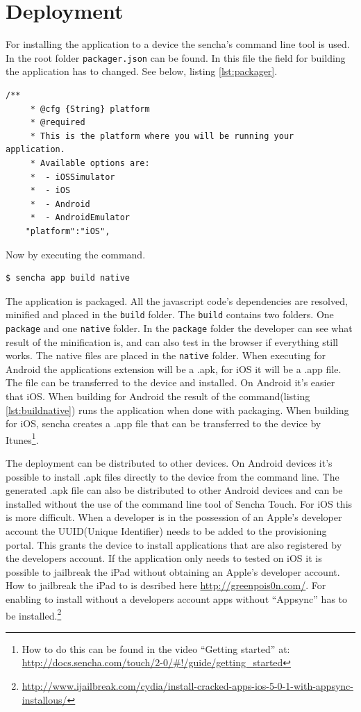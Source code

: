 \section{Deployment}
For installing the application to a device the sencha's command line tool is used. In the root folder \texttt{packager.json} can be found. In this file the field for building the application has to changed. See below, listing \ref{lst:packager}.
\begin{lstlisting}[caption={packager.json},label={lst:packager}]
	/**
	 * @cfg {String} platform
	 * @required
	 * This is the platform where you will be running your application.
	 * Available options are:
	 *  - iOSSimulator
	 *  - iOS
	 *  - Android
	 *  - AndroidEmulator
	"platform":"iOS",
\end{lstlisting}
Now by executing the command.
\label{appnative}
\begin{lstlisting}[caption={command to build native},label={lst:buildnative}]
$ sencha app build native
\end{lstlisting}
The application is packaged. All the javascript code's dependencies are resolved, minified and placed in the \texttt{build} folder. The \texttt{build} contains two folders. One \texttt{package} and one \texttt{native} folder. In the \texttt{package} folder the developer can see what result of the minification is, and can also test in the browser if everything still works. The native files are placed in the \texttt{native} folder. When executing for Android the applications extension will be a .apk,  for iOS it will be a .app file.  The file can be transferred to the device and installed. On Android it's easier that iOS. When building for Android the result of the command(listing \ref{lst:buildnative}) runs the application when done with packaging. When building for iOS, sencha creates a .app file that can be transferred to the device by Itunes\footnote{How to do this can be found in the video ``Getting started'' at: \url{http://docs.sencha.com/touch/2-0/\#!/guide/getting\_started}}.

The deployment can be distributed to other devices. On Android devices it's possible to install .apk files directly to the device from the command line. The generated .apk file can also be distributed to other Android devices and can be installed without the use of the command line tool of Sencha Touch.
For iOS this is more difficult. When a developer is in the possession of an Apple's developer account the UUID(Unique Identifier) needs to be added to the provisioning portal. This grants the device to install applications that are also registered by the developers account. If the application only needs to tested on iOS it is possible to jailbreak the iPad without obtaining an Apple's developer account. How to jailbreak the iPad to is desribed here \url{http://greenpois0n.com/}. For enabling to install without a developers account apps without ``Appsync'' has to be installed.\footnote{\url{http://www.ijailbreak.com/cydia/install-cracked-apps-ios-5-0-1-with-appsync-installous/}}


